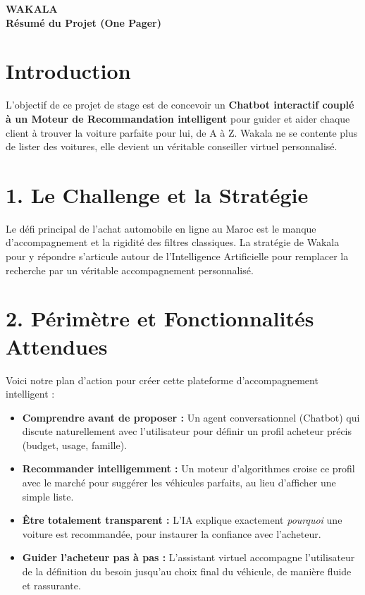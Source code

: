 \documentclass[a4paper, 11pt]{article}
\begin{document}
\begin{center}
    {\Huge \textcolor{primaryBlue}{\textbf{WAKALA}}}\\[0.2cm]
    {\large \bfseries \textcolor{primaryBlue}{Résumé du Projet (One Pager)}}
\end{center}

\vspace{0.5cm}

\section*{Introduction}
L'objectif de ce projet de stage est de concevoir un \textbf{Chatbot interactif couplé à un Moteur de Recommandation intelligent} pour guider et aider chaque client à trouver la voiture parfaite pour lui, de A à Z. Wakala ne se contente plus de lister des voitures, elle devient un véritable conseiller virtuel personnalisé.

\vspace{0.3cm}

\section*{1. Le Challenge et la Stratégie}
Le défi principal de l'achat automobile en ligne au Maroc est le manque d'accompagnement et la rigidité des filtres classiques. La stratégie de Wakala pour y répondre s'articule autour de l'Intelligence Artificielle pour remplacer la recherche par un véritable accompagnement personnalisé.

\section*{2. Périmètre et Fonctionnalités Attendues}
Voici notre plan d'action pour créer cette plateforme d'accompagnement intelligent :
\begin{itemize}[label=\textbullet]
    \item \textbf{Comprendre avant de proposer :} Un agent conversationnel (Chatbot) qui discute naturellement avec l'utilisateur pour définir un profil acheteur précis (budget, usage, famille).
    \item \textbf{Recommander intelligemment :} Un moteur d'algorithmes croise ce profil avec le marché pour suggérer les véhicules parfaits, au lieu d'afficher une simple liste.
    \item \textbf{Être totalement transparent :} L'IA explique exactement \textit{pourquoi} une voiture est recommandée, pour instaurer la confiance avec l'acheteur.
    \item \textbf{Guider l'acheteur pas à pas :} L'assistant virtuel accompagne l'utilisateur de la définition du besoin jusqu'au choix final du véhicule, de manière fluide et rassurante.
\end{itemize}
\end{document}
